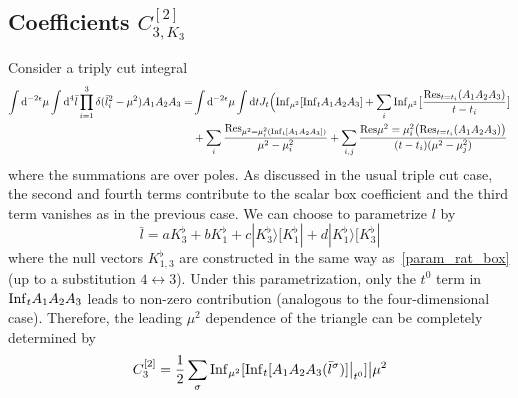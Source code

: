 \subsection{Coefficients $C_{3,K_{3}}^{[2]}$}
Consider a triply cut integral
\begin{equation}
\begin{split}
\int \textrm{d}^{-2\epsilon}\mu \int \textrm{d}^4\bar{l}\prod_{i=1}^3\delta(\bar{l}_i^2 - \mu^2)A_1A_2A_3
= &
\int \textrm{d}^{-2\epsilon}\mu\int \textrm{d} t J_t \Big(
\mathrm{Inf}_{\mu^2}[\mathrm{Inf}_tA_1A_2A_3] 
+ \sum_i\mathrm{Inf}_{\mu^2}\big[\frac{\mathrm{Res}_{t=t_i}(A_1A_2A_3)}{t-t_i}\big]
\\ &
+ \sum_i\frac{\mathrm{Res}_{\mu^2 = \mu_i^2(\mathrm{Inf}_t[A_1A_2A_3])}}{\mu^2 -\mu_i^2}
+\sum_{i,j}\frac{\mathrm{Res}{\mu^2 = \mu_i^2}\big(\mathrm{Res}_{t=t_i}(A_1A_2A_3)\big)}{(t-t_i)(\mu^2 - \mu_j^2)}
\end{split}
\end{equation}
where the summations are over poles.
As discussed in the usual triple cut case, the second and fourth terms contribute to the scalar box coefficient and the third term vanishes as in the previous case.
We can choose to parametrize $l$ by
\begin{equation}
\bar{l} = a K_3^\flat + bK_1^\flat + c|K_3^\flat\rangle [K_1^\flat| + d|K_1^\flat\rangle[K_3^\flat|
\end{equation}
where the null vectors $K_{1,3}^\flat$ are constructed in the same way as~\cref{param_rat_box} (up to a substitution $4\leftrightarrow 3$).
Under this parametrization, only the $t^0$ term in $\mathrm{Inf}_tA_1A_2A_3$ leads to non-zero contribution (analogous to the four-dimensional case).
Therefore, the leading $\mu^2$ dependence of the triangle can be completely determined by 
\begin{equation}
C_3^{[2]} = \frac{1}{2}\sum_\sigma\mathrm{Inf}_{\mu^2}[\mathrm{Inf}_t[A_1A_2A_3(\bar{l}^\sigma)]\big|_{t^0}]\big|{\mu^2}
\end{equation}
%
%
